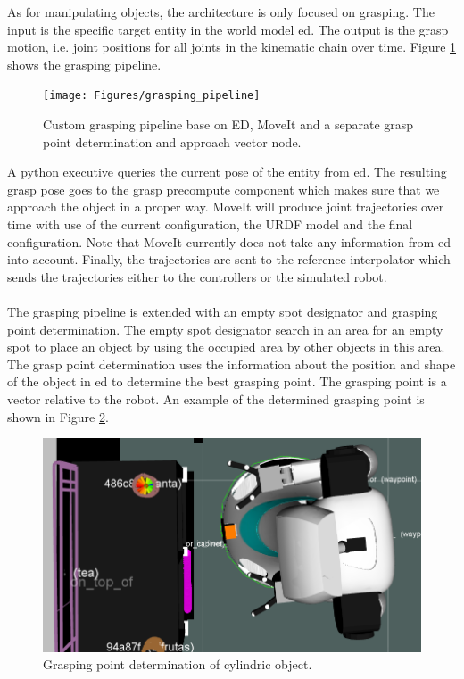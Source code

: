 As for manipulating objects, the architecture is only focused on grasping. The input is the specific target entity in the world model \acrshort{ed}. The output is the grasp motion, i.e. joint positions for all joints in the kinematic chain over time. Figure \ref{fig:grasping_pipeline} shows the grasping pipeline.
\begin{figure}[h]
    \centering
	\texttt{[image: Figures/grasping\_pipeline]}
	\caption{Custom grasping pipeline base on ED, MoveIt and a separate grasp point determination and approach vector node.}
	\label{fig:grasping_pipeline}
\end{figure}
A python executive queries the current pose of the entity from \acrshort{ed}. The resulting grasp pose goes to the grasp precompute component which makes sure that we approach the object in a proper way. MoveIt will produce joint trajectories over time with use of the current configuration, the URDF model and the final configuration. Note that MoveIt currently does not take any information from \acrshort{ed} into account. Finally, the trajectories are sent to the reference interpolator which sends the trajectories either to the controllers or the simulated robot.
\\\\
The grasping pipeline is extended with an empty spot designator and grasping point determination. The empty spot designator search in an area for an empty spot to place an object by using the occupied area by other objects in this area.
\\
The grasp point determination uses the information about the position and shape of the object in \acrshort{ed} to determine the best grasping point. The grasping point is a vector relative to the robot. An example of the determined grasping point is shown in Figure \ref{fig:grasping_point_determination}.
 \begin{figure}[h]
    \centering
	\includegraphics[width = 0.8\linewidth]{Figures/grasp_point_determination}
	\caption{Grasping point determination of cylindric object.}
	\label{fig:grasping_point_determination}
\end{figure}